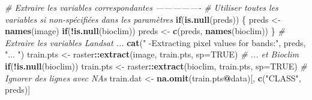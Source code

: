 \documentclass[a4paper, notitlepage, 12pt, krantz2]{krantz}
\newenvironment{Shaded}{\begin{snugshade}}{\end{snugshade}}
\newcommand{\CommentTok}[1]{\textcolor[rgb]{0.56,0.35,0.01}{\textit{#1}}}
\newcommand{\ControlFlowTok}[1]{\textcolor[rgb]{0.13,0.29,0.53}{\textbf{#1}}}
\newcommand{\DataTypeTok}[1]{\textcolor[rgb]{0.13,0.29,0.53}{#1}}
\newcommand{\KeywordTok}[1]{\textcolor[rgb]{0.13,0.29,0.53}{\textbf{#1}}}
\newcommand{\NormalTok}[1]{#1}
\newcommand{\OperatorTok}[1]{\textcolor[rgb]{0.81,0.36,0.00}{\textbf{#1}}}
\newcommand{\OtherTok}[1]{\textcolor[rgb]{0.56,0.35,0.01}{#1}}
\newcommand{\StringTok}[1]{\textcolor[rgb]{0.31,0.60,0.02}{#1}}
\begin{document}
\begin{Shaded}
\begin{Highlighting}[]
  \CommentTok{# Extraire les variables correspondantes ----------------}
  \CommentTok{# Utiliser toutes les variables si non-spécifiées dans les paramètres}
  \ControlFlowTok{if}\NormalTok{(}\KeywordTok{is.null}\NormalTok{(preds)) \{}
\NormalTok{    preds <-}\StringTok{ }\KeywordTok{names}\NormalTok{(image)}
    \ControlFlowTok{if}\NormalTok{(}\OperatorTok{!}\KeywordTok{is.null}\NormalTok{(bioclim)) preds <-}\StringTok{ }\KeywordTok{c}\NormalTok{(preds, }\KeywordTok{names}\NormalTok{(bioclim))}
\NormalTok{  \}}
  \CommentTok{# Extraire les variables Landsat ...}
  \KeywordTok{cat}\NormalTok{(}\StringTok{"    -Extracting pixel values for bands:"}\NormalTok{, preds, }\StringTok{"... "}\NormalTok{)}
\NormalTok{  train.pts <-}\StringTok{ }\NormalTok{raster}\OperatorTok{::}\KeywordTok{extract}\NormalTok{(image, train.pts, }\DataTypeTok{sp=}\OtherTok{TRUE}\NormalTok{)}
  \CommentTok{# ... et Bioclim}
  \ControlFlowTok{if}\NormalTok{(}\OperatorTok{!}\KeywordTok{is.null}\NormalTok{(bioclim)) train.pts <-}\StringTok{ }\NormalTok{raster}\OperatorTok{::}\KeywordTok{extract}\NormalTok{(bioclim, train.pts, }\DataTypeTok{sp=}\OtherTok{TRUE}\NormalTok{)}
  \CommentTok{# Ignorer des lignes avec NAs}
\NormalTok{  train.dat <-}\StringTok{ }\KeywordTok{na.omit}\NormalTok{(train.pts}\OperatorTok{@}\NormalTok{data)[, }\KeywordTok{c}\NormalTok{(}\StringTok{"CLASS"}\NormalTok{, preds)]}
  

\end{Highlighting}
\end{Shaded}
\end{document}
